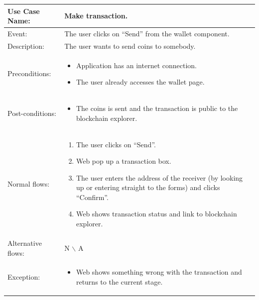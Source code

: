\begin{table}[]
    \begin{tabular}{m{4cm} m{11cm} }
        \toprule
        Use Case Name:     & Make transaction.                                    \\ 
        \midrule 
        Event:             & The user clicks on “Send” from the wallet component. \\ 
        \midrule 
        Description:       & The user wants to send coins to somebody.  \\ 
        \midrule 
        Preconditions:     & \begin{itemize}
            \item Application has an internet connection.
            \item The user already accesses the wallet page.
        \end{itemize}                           \\ 
        \midrule 
        Post-conditions:   & \begin{itemize}
            \item The coins is sent and the transaction is public to the blockchain explorer.
        \end{itemize}                           \\ 
        \midrule 
        Normal flows:      & \begin{enumerate}
            \item The user clicks on “Send”.
            \item Web pop up a transaction box.
            \item The user enters the address of the receiver (by looking up or entering straight to the forms) and clicks “Confirm”.
            \item Web shows transaction status and link to blockchain explorer.
        \end{enumerate}                           \\ 
        \midrule 
        Alternative flows: & N $\backslash$ A                                     \\
        \midrule 
        Exception:         & \begin{itemize}
            \item {Web shows something wrong with the transaction and returns to the current stage.}
        \end{itemize}                           \\ 
        \bottomrule
    \end{tabular}
\end{table}


